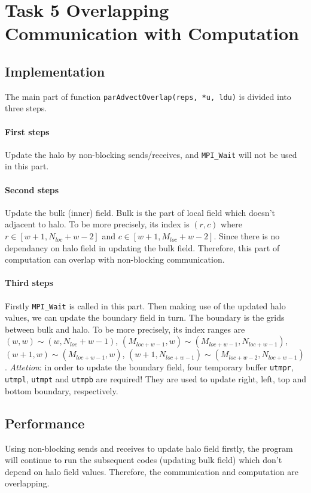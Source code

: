 \section{Task 5 Overlapping Communication with Computation}

\subsection{Implementation}
The main part of function \lstinline{parAdvectOverlap(reps, *u, ldu)} is divided into three steps.
\paragraph{First steps} Update the halo by non-blocking sends/receives, and \lstinline{MPI_Wait} will not be used in this part.
\paragraph{Second steps} Update the bulk (inner) field. Bulk is the part of local field which doesn't adjacent to halo. To be more precisely,
its index is $(r,c)$ where $r\in [w+1,N_{loc}+w-2]$ and $c\in [w+1,M_{loc}+w-2]$. Since there is no dependancy on
halo field in updating the bulk field. Therefore, this part of computation can overlap with non-blocking communication.
\paragraph{Third steps} Firstly \lstinline{MPI_Wait} is called in this part. Then making use of the updated halo values,
we can update the boundary field in turn. The boundary is the grids between bulk and halo. To be more precisely,
its index ranges are $(w,w) \sim (w,N_{loc}+w-1)$, $(M_{loc+w-1}, w) \sim (M_{loc+w-1}, N_{loc+w-1})$, 
$(w+1, w) \sim (M_{loc+w-1}, w)$, $(w+1, N_{loc+w-1}) \sim (M_{loc+w-2}, N_{loc+w-1})$. \textit{Attetion}: in
order to update the boundary field, four temporary buffer \lstinline{utmpr}, \lstinline{utmpl}, 
\lstinline{utmpt} and \lstinline{utmpb} are required!
They are used to update right, left, top and bottom boundary, respectively.

\subsection{Performance}
Using non-blocking sends and receives to update halo field firstly,
the program will continue to run the subsequent codes (updating bulk field) which don't depend on halo field values.
Therefore, the communication and computation are overlapping. 

